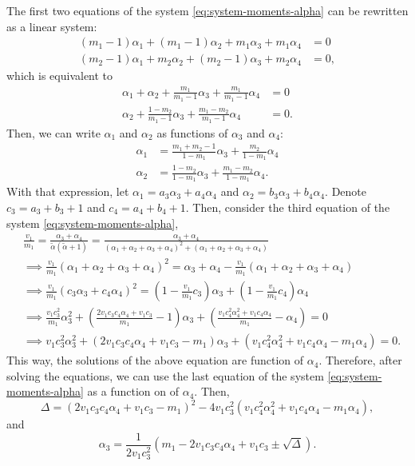 \documentclass[a4paper, notitlepage, 11pt]{article}
\theoremstyle{definition}
\theoremstyle{remark}
\begin{document}
The first two equations of the system \eqref{eq:system-moments-alpha} can be
rewritten as a linear system:
\begin{align*}
  (m_1 - 1)\alpha_1 + (m_1 - 1)\alpha_2 + m_1\alpha_3 + m_1\alpha_4 &= 0 \\
  (m_2 - 1)\alpha_1 + m_2\alpha_2 + (m_2-1)\alpha_3 + m_2\alpha_4 &= 0,   
\end{align*}
which is equivalent to 
\begin{align*}
  \alpha_1 + \alpha_2 + \frac{m_1}{m_1-1}\alpha_3 + \frac{m_1}{m_1-1}\alpha_4 &= 0 \\
  \alpha_2 + \frac{1-m_2}{m_1-1}\alpha_3 + \frac{m_1-m_2}{m_1-1}\alpha_4 &= 0.
\end{align*}
Then, we can write $\alpha_1$ and $\alpha_2$ as functions of $\alpha_3$ and
$\alpha_4$:
\begin{align}
  \alpha_1 &= \frac{m_1+m_2-1}{1-m_1}\alpha_3 + \frac{m_2}{1-m_1}\alpha_4 \\
  \alpha_2 &= \frac{1-m_2}{1-m_1}\alpha_3 + \frac{m_1-m_2}{1-m_1}\alpha_4.
\end{align}
With that expression, let $\alpha_1 = a_3\alpha_3 + a_4\alpha_4$ and $\alpha_2
= b_3\alpha_3 + b_4\alpha_4$. Denote $c_3 = a_3 + b_3 + 1$ and $c_4 = a_4 +
b_4 + 1$. Then, consider the third equation of the system
\eqref{eq:system-moments-alpha}, 
\begin{equation*}
  \begin{split}
    &\frac{v_1}{m_1} = \frac{\alpha_3+\alpha_4}{\tilde{\alpha}(\tilde{\alpha} +1)} = \frac{\alpha_3+\alpha_4}{(\alpha_1+\alpha_2+\alpha_3+\alpha_4)^2 + (\alpha_1+\alpha_2+\alpha_3+\alpha_4)} \\
     &\implies \frac{v_1}{m_1}(\alpha_1 + \alpha_2 + \alpha_3 + \alpha_4)^2 = \alpha_3 + \alpha_4 - \frac{v_1}{m_1}(\alpha_1 + \alpha_2 + \alpha_3 + \alpha_4) \\
    &\implies \frac{v_1}{m_1}(c_3\alpha_3 + c_4\alpha_4)^2 = \left(1-\frac{v_1}{m_1}c_3\right)\alpha_3 + \left(1-\frac{v_1}{m_1}c_4\right)\alpha_4 \\
    &\implies \frac{v_1c_3^2}{m_1}\alpha_3^2 + \left(\frac{2v_1c_3c_4\alpha_4+v_1c_3}{m_1} - 1\right)\alpha_3 + \left(\frac{v_1c_4^2\alpha_4^2 + v_1c_4\alpha_4}{m_1} - \alpha_4\right) = 0 \\ 
    &\implies v_1c_3^2\alpha_3^2 + (2v_1c_3c_4\alpha_4+v_1c_3 - m_1)\alpha_3 + (v_1c_4^2\alpha_4^2 + v_1c_4\alpha_4 - m_1\alpha_4) = 0.
  \end{split}
\end{equation*}
This way, the solutions of the above equation are function of $\alpha_4$.
Therefore, after solving the equations, we can use the last equation of the
system \eqref{eq:system-moments-alpha} as a function on of $\alpha_4$. Then, 
$$
\Delta = (2v_1c_3c_4\alpha_4+v_1c_3 - m_1)^2 - 4v_1c_3^2(v_1c_4^2\alpha_4^2 + v_1c_4\alpha_4 - m_1\alpha_4), 
$$
and 
$$
\alpha_3 = \frac{1}{2v_1c_3^2}(m_1 - 2v_1c_3c_4\alpha_4+v_1c_3 \pm \sqrt{\Delta}).
$$


 
\end{document}
